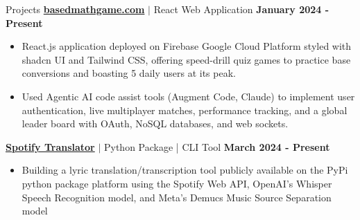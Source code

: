 \documentclass{resume}
\begin{document}
\begin{rSection}{Projects}
    \href{https://basedmathgame.com}{\textbf{basedmathgame.com}} $|$ React Web Application \hfill \textbf{January 2024 - Present}
    \vspace{-4pt}
    \begin{itemize}
        \itemsep -3pt {} 
            \item React.js application deployed on Firebase Google Cloud Platform styled with shadcn UI and Tailwind CSS, offering speed-drill quiz games to practice base conversions and boasting 5 daily users at its peak.
            \item Used Agentic AI code assist tools (Augment Code, Claude) to implement user authentication, live multiplayer matches, performance tracking, and a global leader board with OAuth, NoSQL databases, and web sockets.
    \end{itemize}

    \href{https://pypi.org/project/spotify-translator/}{\textbf{Spotify Translator}} $|$ Python Package | CLI Tool \hfill \textbf{March 2024 - Present}
    \vspace{-4pt}
    \begin{itemize}
        \itemsep -3pt {} 
            \item Building a lyric translation/transcription tool publicly available on the PyPi python package platform using the Spotify Web API, OpenAI's Whisper Speech Recognition model, and Meta's Demucs Music Source Separation model
    \end{itemize}
\end{rSection}



\end{document}
